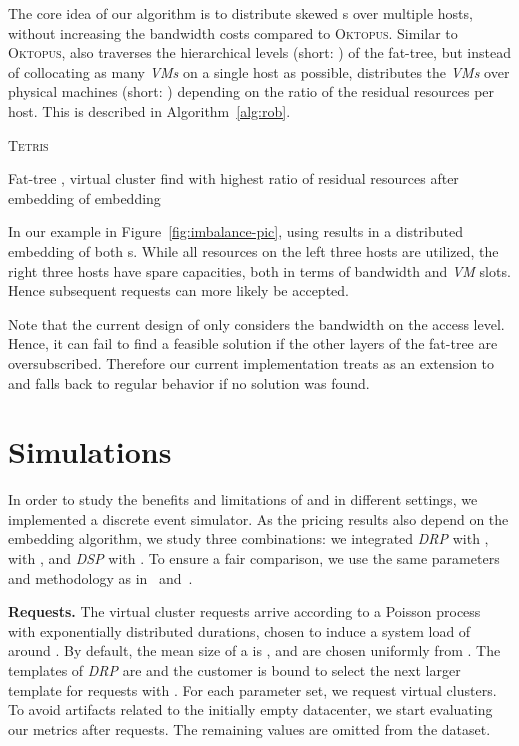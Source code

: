 \documentclass{sig-alternate-per}
\newcommand{\ALG}{\textsc{Tetris}}
\newcommand{\OKTO}{\textsc{Oktopus}}
\newcommand{\pricing}{\textsc{DSP}}
\begin{document}
The core idea of our algorithm  is to distribute
skewed s over multiple hosts, without increasing the bandwidth costs compared to \OKTO. Similar to \OKTO, 
also
traverses the hierarchical levels (short: ) of the fat-tree, but instead of collocating as many \emph{VMs} on a
single host as
possible,  distributes the \emph{VMs} over physical machines (short: ) depending on the ratio of the residual
resources per host. This is described
in Algorithm~\ref{alg:rob}.

\begin{algorithm}[ht]
    \caption{\ALG}
    \label{alg:rob}
    \begin{algorithmic}[1]
    \REQUIRE Fat-tree , virtual cluster 
      \FOR{}
	\STATE find   with highest ratio of residual resources after embedding of 
      \ENDFOR
	\RETURN embedding	
      \ENDIF
    \ENDFOR
    \RETURN 	
    \end{algorithmic}
\end{algorithm}

In our example in Figure~\ref{fig:imbalance-pic}, using 
results in a distributed embedding of both
s. While all resources on the left three hosts are utilized, the right three hosts have spare capacities, both in
terms of bandwidth and \emph{VM} slots. Hence subsequent requests can more likely be accepted.

Note that the current design of  only considers the bandwidth on the access
level. Hence, it can fail to find a feasible solution if the other layers of the fat-tree are oversubscribed. Therefore
our current implementation treats  as an extension to  and falls back to regular  behavior if no
solution was found.

\section{Simulations}\label{sec:simulations}

In order to study the benefits and limitations of  and  in different settings,
we implemented a discrete event simulator. As the pricing results also
depend on the embedding algorithm, we study three combinations:  we integrated \emph{DRP} with ,  with
, and
\emph{\pricing} with . To ensure a fair comparison, we use the same parameters and methodology
as in~\cite{short-ballani2011towards} and~\cite{short-ballani2011price}.

\textbf{Requests.} The virtual cluster requests arrive according to a Poisson process with exponentially distributed
durations, chosen to induce a system load of around . By default, the mean size of a  is ,  and 
are
chosen uniformly from . The templates  of \emph{DRP} are  and the customer is
bound to select the next larger template for requests with . For each parameter
set, we request  virtual clusters. To avoid artifacts related to the
initially empty datacenter, we start evaluating our metrics after  requests. The remaining values are omitted from
the dataset.
\end{document}
